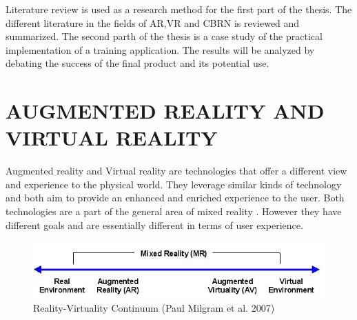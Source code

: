 \documentclass[12pt, a4paper,oneside, nocenter]{thesis}
\begin{document}
Literature review is used as a research method for the first part of the thesis. The different literature in the fields of AR,VR and CBRN is reviewed and summarized. The second parth of the thesis is a case study of the practical implementation of a training application. The results will be analyzed by debating the success of the final product and its potential use.
\par
\chapter{\MakeUppercase{Augmented Reality and Virtual Reality}}
Augmented reality and Virtual reality are technologies that offer a different view and experience to the physical world. They leverage similar kinds of technology and both aim to provide an enhanced and enriched experience to the user. Both technologies are a part of the general area of mixed reality . However they have different goals and are essentially different in terms of user experience.

\begin{figure}[H]
\includegraphics[width=\textwidth]{Virtuality_Continuum_2}
\caption{Reality-Virtuality Continuum (Paul Milgram et al. 2007)}
\label{fig:reality-virtuality}
\end{figure}
\end{document}
